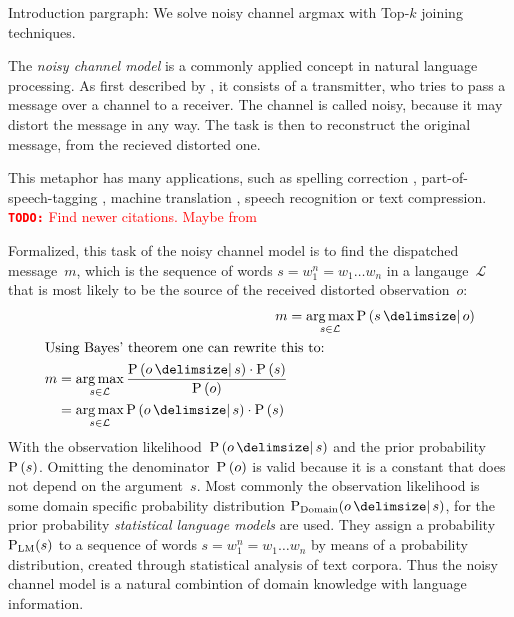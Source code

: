 \documentclass[m,bachelor,binding]{WeSTthesis}
\DeclareMathOperator*{\Argmax}{arg\,max}
\newcommand{\Language}{\mathcal{L}}
\newenvironment{draft}{\color{draftcolor}}{}
\newcommand{\todo}[1]{\textcolor{red}{{\footnotesize\textbf{\texttt{TODO:}}} #1}}
\begin{document}
\begin{draft}
Introduction pargraph: We solve noisy channel argmax with Top-$k$ joining
techniques.
\end{draft}

The \emph{noisy channel model} is a commonly applied concept in natural language
processing.
As first described by \cite{Shannon1948}, it consists of a transmitter, who
tries to pass a message over a channel to a receiver.
The channel is called noisy, because it may distort the message in any way.
The task is then to reconstruct the original message, from the recieved
distorted one.

This metaphor has many applications, such as spelling correction
\parencite{JurafskyMartin2009,Manning2008,Kernighan1990,Mays1991},
part-of-speech-tagging \parencite{Church1988}, machine translation
\parencite{Brown1990}, speech recognition or text compression.
\todo{Find newer citations. Maybe from \cite{Bickel2005}}

Formalized, this task of the noisy channel model is to find the dispatched
message~$m$, which is the sequence of words $s = w_1^n = w_1 \ldots w_n$ in a
langauge~$\Language$ that is most likely to be the source of the received
distorted observation~$o$:
\begin{align}
  \label{eq:noisychannel}
  m &= \Argmax_{s \in \Language} \Prob{s}{o} \\
  \intertext{Using Bayes' theorem one can rewrite this to:}
  \label{eq:noisychannelbayes}
  \begin{split}
    m &= \Argmax_{s \in \Language} \frac{\Prob{o}{s} \cdot \Prob{s}}{\Prob{o}} \\
      &= \Argmax_{s \in \Language} \Prob{o}{s} \cdot \Prob{s}
  \end{split}
\end{align}
With the observation likelihood~$\Prob{o}{s}$ and the prior
probability~$\Prob{s}$.
Omitting the denominator~$\Prob{o}$ is valid because it is a constant that does
not depend on the argument~$s$.
Most commonly the observation likelihood is some domain specific probability
distribution $\Prob[\text{Domain}]{o}{s}$, for the prior probability
\emph{statistical language models} are used.
They assign a probability $\Prob[\text{LM}]{s}$ to a sequence of words
$s = w_1^n = w_1 \ldots w_n$ by means of a probability distribution, created
through statistical analysis of text corpora.
Thus the noisy channel model is a natural combintion of domain knowledge with
language information.
\end{document}
